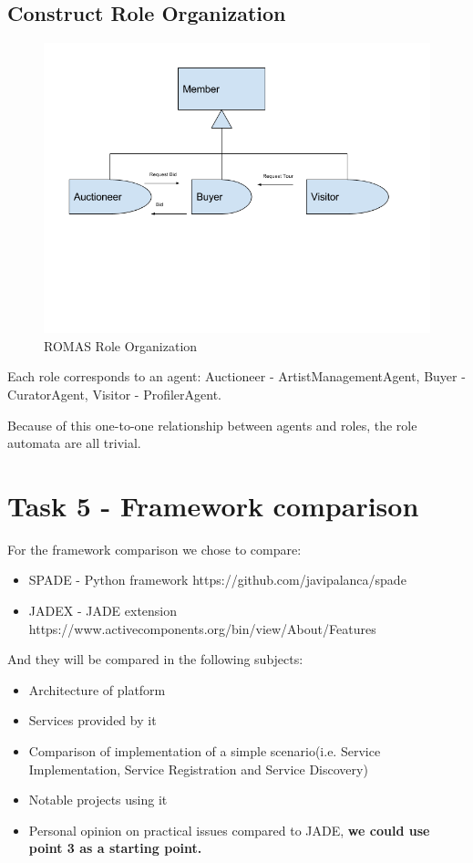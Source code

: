 \documentclass[a4paper, 11pt]{article}
\begin{document}
\subsection{Construct Role Organization}
\begin{figure}[H]
	\caption{ROMAS Role Organization}
	\centering
	\includegraphics[width=\textwidth]{./images/ROMASroleorganization.png}
\end{figure}

Each role corresponds to an agent: Auctioneer - ArtistManagementAgent, Buyer - CuratorAgent,
Visitor - ProfilerAgent.

Because of this one-to-one relationship between agents and roles, the role automata are all
trivial.

\clearpage

\section{Task 5 - Framework comparison}

For the framework comparison we chose to compare: 
\begin{itemize}
	\item SPADE - Python framework
	\subitem https://github.com/javipalanca/spade
	\item JADEX - JADE extension
	\subitem https://www.activecomponents.org/bin/view/About/Features
\end{itemize}

\noindent And they will be compared in the following subjects:
\begin{itemize}
	\item Architecture of platform
	\item Services provided by it
	\item Comparison of implementation of a simple scenario(i.e. Service Implementation,	Service	Registration and Service Discovery)
	\item Notable projects using it
	\item Personal opinion on practical issues compared to JADE, \textbf{we could use point 3 as a starting point.}
\end{itemize}
\end{document}
